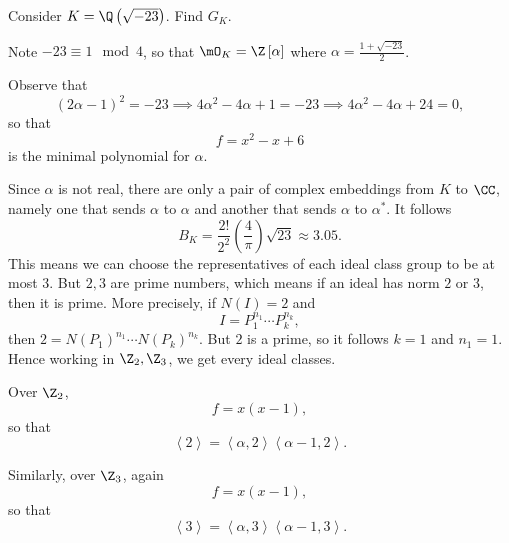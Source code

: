 \documentclass[pmath441]{subfiles}
\begin{document}
    \rruleline
    
    \begin{example}{}
        Consider $K=\Q\left( \sqrt{-23} \right)$. Find $G_K$. 
    \end{example}
    
    \begin{answer}
        Note $-23\equiv 1\mod 4$, so that $\mO_K = \Z\left[ \alpha \right]$ where $\alpha = \frac{1+\sqrt{-23}}{2}$. 

        Observe that
        \begin{equation*}
            \left( 2\alpha-1 \right)^{2} = -23 \implies 4\alpha^{2}-4\alpha+1 = -23 \implies 4\alpha^{2}-4\alpha+24 = 0,
        \end{equation*} 
        so that
        \begin{equation*}
            f = x^{2}-x+6
        \end{equation*}
        is the minimal polynomial for $\alpha$.

        Since $\alpha$ is not real, there are only a pair of complex embeddings from $K$ to $\CC$, namely one that sends $\alpha$ to $\alpha$ and another that sends $\alpha$ to $\alpha^{*}$. It follows
        \begin{equation*}
            B_K = \frac{2!}{2^2}\left( \frac{4}{\pi} \right)\sqrt{23} \approx 3.05.
        \end{equation*}
        This means we can choose the representatives of each ideal class group to be at most $3$. But $2,3$ are prime numbers, which means if an ideal has norm $2$ or $3$, then it is prime. More precisely, if $N\left( I \right)=2$ and
        \begin{equation*}
            I = P_1^{n_1}\cdots P_k^{n_k},
        \end{equation*}
        then $2 = N\left( P_1 \right)^{n_1}\cdots N\left( P_k \right)^{n_k}$. But $2$ is a prime, so it follows $k=1$ and $n_1=1$. Hence working in $\Z_2,\Z_3$, we get every ideal classes.

        Over $\Z_2$,
        \begin{equation*}
            f = x\left( x-1 \right),
        \end{equation*}
        so that
        \begin{equation}
            \left< 2 \right> = \left< \alpha,2 \right>\left< \alpha-1,2 \right>.
        \end{equation}

        Similarly, over $\Z_3$, again
        \begin{equation*}
            f = x\left( x-1 \right),
        \end{equation*}
        so that
        \begin{equation}
            \left< 3 \right> = \left< \alpha,3 \right>\left< \alpha-1,3 \right>.   
        \end{equation}


\end{answer}
\end{document}
